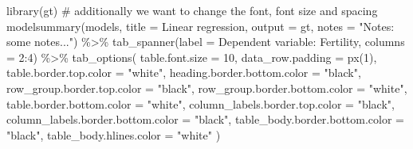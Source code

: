 \documentclass[
  letterpaper,
  DIV=11,
  numbers=noendperiod]{scrartcl}
\newenvironment{Shaded}{\begin{snugshade}}{\end{snugshade}}
\newcommand{\AttributeTok}[1]{\textcolor[rgb]{0.40,0.45,0.13}{#1}}
\newcommand{\CommentTok}[1]{\textcolor[rgb]{0.37,0.37,0.37}{#1}}
\newcommand{\DecValTok}[1]{\textcolor[rgb]{0.68,0.00,0.00}{#1}}
\newcommand{\FunctionTok}[1]{\textcolor[rgb]{0.28,0.35,0.67}{#1}}
\newcommand{\NormalTok}[1]{\textcolor[rgb]{0.00,0.23,0.31}{#1}}
\newcommand{\SpecialCharTok}[1]{\textcolor[rgb]{0.37,0.37,0.37}{#1}}
\newcommand{\StringTok}[1]{\textcolor[rgb]{0.13,0.47,0.30}{#1}}
\begin{document}
\begin{Shaded}
\begin{Highlighting}[]
\FunctionTok{library}\NormalTok{(gt)}
\CommentTok{\# additionally we want to change the font, font size and spacing}
\FunctionTok{modelsummary}\NormalTok{(models,}
             \AttributeTok{title =} \StringTok{\textquotesingle{}Linear regression\textquotesingle{}}\NormalTok{,}
             \AttributeTok{output =} \StringTok{\textquotesingle{}gt\textquotesingle{}}\NormalTok{,}
             \AttributeTok{notes =} \StringTok{"Notes: some notes..."}\NormalTok{) }\SpecialCharTok{\%\textgreater{}\%}
    \FunctionTok{tab\_spanner}\NormalTok{(}\AttributeTok{label =} \StringTok{\textquotesingle{}Dependent variable: Fertility\textquotesingle{}}\NormalTok{, }\AttributeTok{columns =} \DecValTok{2}\SpecialCharTok{:}\DecValTok{4}\NormalTok{) }\SpecialCharTok{\%\textgreater{}\%}
  \FunctionTok{tab\_options}\NormalTok{(}
    \AttributeTok{table.font.size =} \DecValTok{10}\NormalTok{,}
    \AttributeTok{data\_row.padding =} \FunctionTok{px}\NormalTok{(}\DecValTok{1}\NormalTok{),}
    \AttributeTok{table.border.top.color =} \StringTok{"white"}\NormalTok{,}
    \AttributeTok{heading.border.bottom.color =} \StringTok{"black"}\NormalTok{,}
    \AttributeTok{row\_group.border.top.color =} \StringTok{"black"}\NormalTok{,}
    \AttributeTok{row\_group.border.bottom.color =} \StringTok{"white"}\NormalTok{,}
    \AttributeTok{table.border.bottom.color =} \StringTok{"white"}\NormalTok{,}
    \AttributeTok{column\_labels.border.top.color =} \StringTok{"black"}\NormalTok{,}
    \AttributeTok{column\_labels.border.bottom.color =} \StringTok{"black"}\NormalTok{,}
    \AttributeTok{table\_body.border.bottom.color =} \StringTok{"black"}\NormalTok{,}
    \AttributeTok{table\_body.hlines.color =} \StringTok{"white"}
\NormalTok{  )}
\end{Highlighting}
\end{Shaded}
\end{document}
